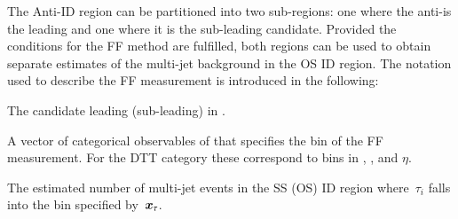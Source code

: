 {%
  \newcommand*{\ffargs}{\ensuremath{( \myvec{x}_{\tau} )}\xspace}

  \newcommand*{\NmjID}[2]{\ensuremath{N_\text{multi-jet}^{\text{#1, loose }\tau_{#2}}}\xspace}
  \newcommand*{\NmjIDIncl}[1]{\ensuremath{N_\text{multi-jet}^{\text{#1, ID}}}\xspace}

  \newcommand*{\NmjAntiIDIncl}[1]{\ensuremath{N_\text{multi-jet}^{\text{#1, Anti-ID}}}\xspace}
  \newcommand*{\NmjAntiID}[2]{\ensuremath{N_\text{multi-jet}^{\text{#1, anti-}\tau_{#2}}}\xspace}

  The Anti-ID region can be partitioned into two sub-regions: one where the
  anti-\tauhadvis is the leading and one where it is the sub-leading \tauhadvis
  candidate. Provided the conditions for the FF method are fulfilled, both
  regions can be used to obtain separate estimates of the multi-jet background
  in the OS ID region. The notation used to describe the FF measurement is
  introduced in the following:
  \begin{description}[style=standard]
  \item[$\tau_0$ ($\tau_1$)] The \tauhadvis candidate leading (sub-leading) in \pT.

  \item[$\myvec{x}_\tau$] A vector of categorical observables of \tauhadvis that
    specifies the bin of the FF measurement. For the DTT category these
    correspond to bins in \Ntracks, \pT, and $\eta$.

  \item[$\NmjID{SS(OS)}{i}\ffargs$] The estimated number of multi-jet
    events in the SS (OS) ID region where~$\tau_i$ falls into the bin
    specified by~$\myvec{x}_\tau$.


\end{description}}
